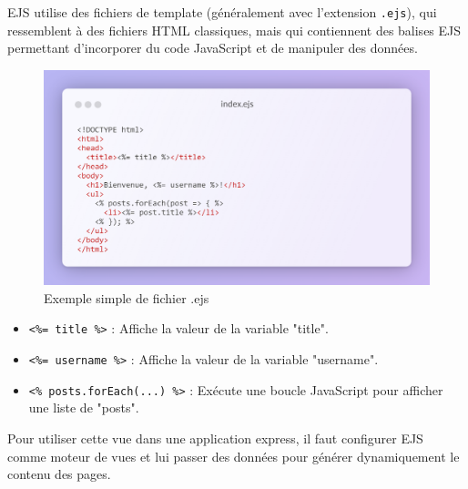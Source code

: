\vspace{0.35cm}

EJS utilise des fichiers de template (généralement avec l'extension \verb|.ejs|), qui ressemblent à des fichiers HTML classiques, mais qui contiennent des balises EJS permettant d'incorporer du code JavaScript et de manipuler des données.

\vspace{0.35cm}

\begin{figure}[H]
\begin{center}
\includegraphics[width=15cm]{assets/presentation/ejs-snippet.png}
\end{center}
\caption{Exemple simple de fichier .ejs}
\end{figure}

\vspace{0.35cm}

\begin{itemize}
    \item \verb|<%= title %>| : Affiche la valeur de la variable "title".
    \item \verb|<%= username %>| : Affiche la valeur de la variable "username".
    \item \verb|<% posts.forEach(...) %>| : Exécute une boucle JavaScript pour afficher une liste de "posts".
\end{itemize}

\vspace{0.35cm}

Pour utiliser cette vue dans une application express, il faut configurer EJS comme moteur de vues et lui passer des données pour générer dynamiquement le contenu des pages.

